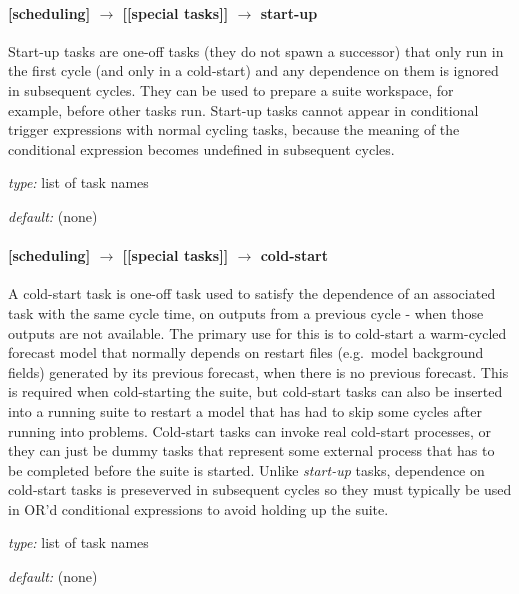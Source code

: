 \paragraph[start-up]{[scheduling] $\rightarrow$ [[special tasks]] $\rightarrow$ start-up}

Start-up tasks are one-off tasks (they do not spawn a successor) that
only run in the first cycle (and only in a cold-start) and any
dependence on them is ignored in subsequent cycles. They can be used to
prepare a suite workspace, for example, before other tasks run. Start-up
tasks cannot appear in conditional trigger expressions with normal
cycling tasks, because the meaning of the conditional expression becomes
undefined in subsequent cycles. 

\begin{myitemize}
    \item {\em type:} list of task names
    \item {\em default:} (none)
\end{myitemize}

\paragraph[cold-start]{[scheduling] $\rightarrow$ [[special tasks]] $\rightarrow$ cold-start}

A cold-start task is one-off task used to satisfy the dependence of an
associated task with the same cycle time, on outputs from a previous
cycle - when those outputs are not available.  The primary use for this
is to cold-start a warm-cycled forecast model that normally depends on
restart files (e.g.\ model background fields) generated by its previous
forecast, when there is no previous forecast.  This is required when
cold-starting the suite, but cold-start tasks can also be inserted into
a running suite to restart a model that has had to skip some cycles
after running into problems. Cold-start tasks can invoke real cold-start
processes, or they can just be dummy tasks that represent some external
process that has to be completed before the suite is started. Unlike
{\em start-up} tasks, dependence on cold-start tasks is preseverved in
subsequent cycles so they must typically be used in OR'd conditional
expressions to avoid holding up the suite.

\begin{myitemize}
    \item {\em type:} list of task names
    \item {\em default:} (none)
\end{myitemize}

